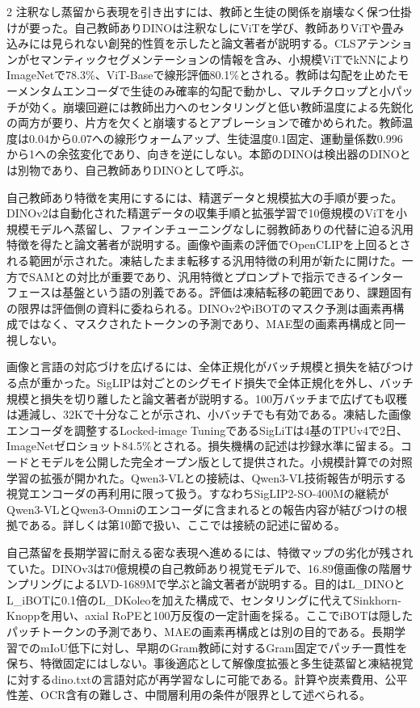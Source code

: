 \documentclass[lualatex,a4paper,10pt]{jlreq}
\begin{document}
\begin{multicols}{2}
\noindent 注釈なし蒸留から表現を引き出すには、教師と生徒の関係を崩壊なく保つ仕掛けが要った。自己教師ありDINOは注釈なしにViTを学び、教師ありViTや畳み込みには見られない創発的性質を示したと論文著者が説明する。CLSアテンションがセマンティックセグメンテーションの情報を含み、小規模ViTでkNNによりImageNetで78.3\%、ViT-Baseで線形評価80.1\%とされる。教師は勾配を止めたモーメンタムエンコーダで生徒のみ確率的勾配で動かし、マルチクロップと小パッチが効く。崩壊回避には教師出力へのセンタリングと低い教師温度による先鋭化の両方が要り、片方を欠くと崩壊するとアブレーションで確かめられた。教師温度は0.04から0.07への線形ウォームアップ、生徒温度0.1固定、運動量係数0.996から1への余弦変化であり、向きを逆にしない。本節のDINOは検出器のDINOとは別物であり、自己教師ありDINOとして呼ぶ。\autocite{vmd034}\par\medskip
\noindent 自己教師あり特徴を実用にするには、精選データと規模拡大の手順が要った。DINOv2は自動化された精選データの収集手順と拡張学習で10億規模のViTを小規模モデルへ蒸留し、ファインチューニングなしに弱教師ありの代替に迫る汎用特徴を得たと論文著者が説明する。画像や画素の評価でOpenCLIPを上回るとされる範囲が示された。凍結したまま転移する汎用特徴の利用が新たに開けた。一方でSAMとの対比が重要であり、汎用特徴とプロンプトで指示できるインターフェースは基盤という語の別義である。評価は凍結転移の範囲であり、課題固有の限界は評価側の資料に委ねられる。DINOv2やiBOTのマスク予測は画素再構成ではなく、マスクされたトークンの予測であり、MAE型の画素再構成と同一視しない。\autocite{vmd035}\par\medskip
\noindent 画像と言語の対応づけを広げるには、全体正規化がバッチ規模と損失を結びつける点が重かった。SigLIPは対ごとのシグモイド損失で全体正規化を外し、バッチ規模と損失を切り離したと論文著者が説明する。100万バッチまで広げても収穫は逓減し、32Kで十分なことが示され、小バッチでも有効である。凍結した画像エンコーダを調整するLocked-image TuningであるSigLiTは4基のTPUv4で2日、ImageNetゼロショット84.5\%とされる。損失機構の記述は抄録水準に留まる。コードとモデルを公開した完全オープン版として提供された。小規模計算での対照学習の拡張が開かれた。Qwen3-VLとの接続は、Qwen3-VL技術報告が明示する視覚エンコーダの再利用に限って扱う。すなわちSigLIP2-SO-400Mの継続がQwen3-VLとQwen3-Omniのエンコーダに含まれるとの報告内容が結びつけの根拠である。詳しくは第10節で扱い、ここでは接続の記述に留める。\autocite{vmd036,vmd065}\par\medskip
\noindent 自己蒸留を長期学習に耐える密な表現へ進めるには、特徴マップの劣化が残されていた。DINOv3は70億規模の自己教師あり視覚モデルで、16.89億画像の階層サンプリングによるLVD-1689Mで学ぶと論文著者が説明する。目的はL\_DINOとL\_iBOTに0.1倍のL\_DKoleoを加えた構成で、センタリングに代えてSinkhorn-Knoppを用い、axial RoPEと100万反復の一定計画を採る。ここでiBOTは隠したパッチトークンの予測であり、MAEの画素再構成とは別の目的である。長期学習でのmIoU低下に対し、早期のGram教師に対するGram固定でパッチ一貫性を保ち、特徴固定にはしない。事後適応として解像度拡張と多生徒蒸留と凍結視覚に対するdino.txtの言語対応が再学習なしに可能である。計算や炭素費用、公平性差、OCR含有の難しさ、中間層利用の条件が限界として述べられる。\autocite{vmd113}\par\medskip

\end{multicols}
\end{document}

